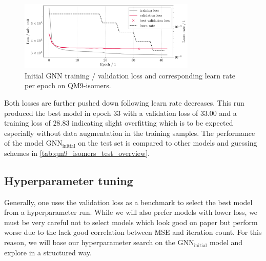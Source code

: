\begin{figure}[H]
    \centering
    \includegraphics[width=0.75\textwidth]{../fig/gnn/MGNN_6-31G_NO_AUG_07_07_manual_ref_train_val_loss.pdf}
    \caption[Initial GNN loss on QM9-isomers]{Initial GNN training / validation loss and corresponding learn rate per epoch on QM9-isomers.}
    \label{fig:initial_train_qm9_isomers}
\end{figure}
Both losses are further pushed down following learn rate decreases. This run produced the best model in epoch 33 with a validation loss of $33.00$ and a training loss of $28.83$ indicating slight overfitting which is to be expected especially without data augmentation in the training samples. The performance of the model $\text{GNN}_\text{initial}$ on the test set is compared to other models and guessing schemes in \autoref{tab:qm9_isomers_test_overview}. 



\subsection{Hyperparameter tuning}
\label{subsec:qm9_isomers_hyperparamtuning}
Generally, one uses the validation loss as a benchmark to select the best model from a hyperparameter run. While we will also prefer models with lower loss, we must be very careful not to select models which look good on paper but perform worse due to the lack good correlation between MSE and iteration count. For this reason, we will base our hyperparameter search on the $\text{GNN}_\text{initial}$ model and explore in a structured way. 


